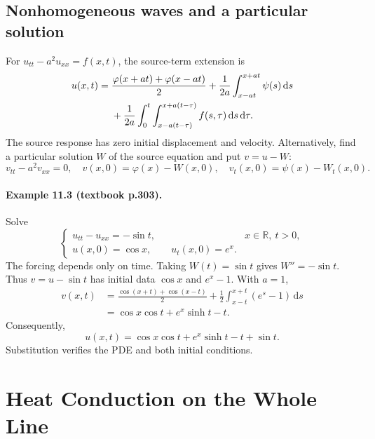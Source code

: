 \documentclass[11pt,a4paper]{article}
\newcommand{\dd}{\,\mathrm{d}}
\newcommand{\R}{\mathbb{R}}
\begin{document}
\subsection{Nonhomogeneous waves and a particular solution}
For $u_{tt}-a^2u_{xx}=f(x,t)$, the source-term extension is
\begin{align}
 u(x,t)={}&\frac{\varphi(x+at)+\varphi(x-at)}2
       +\frac1{2a}\int_{x-at}^{x+at}\psi(s)\dd s\notag\\
 &+\frac1{2a}\int_0^t\int_{x-a(t-\tau)}^{x+a(t-\tau)}f(s,\tau)\dd s\dd\tau.
\end{align}
The source response has zero initial displacement and velocity. Alternatively,
find a particular solution $W$ of the source equation and put $v=u-W$:
\begin{equation}
 v_{tt}-a^2v_{xx}=0,\quad
 v(x,0)=\varphi(x)-W(x,0),\quad v_t(x,0)=\psi(x)-W_t(x,0).
\end{equation}

\paragraph{Example 11.3 (textbook p.303).}
Solve
\begin{equation}
 \begin{cases}
 u_{tt}-u_{xx}=-\sin t,&x\in\R,\ t>0,\\
 u(x,0)=\cos x,\qquad u_t(x,0)=e^x.
 \end{cases}
\end{equation}
The forcing depends only on time. Taking $W(t)=\sin t$ gives $W''=-\sin t$.
Thus $v=u-\sin t$ has initial data $\cos x$ and $e^x-1$. With $a=1$,
\begin{align}
 v(x,t)&=\frac{\cos(x+t)+\cos(x-t)}2+\frac12\int_{x-t}^{x+t}(e^s-1)\dd s\\
       &=\cos x\cos t+e^x\sinh t-t.
\end{align}
Consequently,
\begin{equation}
 \boxed{u(x,t)=\cos x\cos t+e^x\sinh t-t+\sin t.}
\end{equation}
Substitution verifies the PDE and both initial conditions.

\section{Heat Conduction on the Whole Line}
\end{document}
